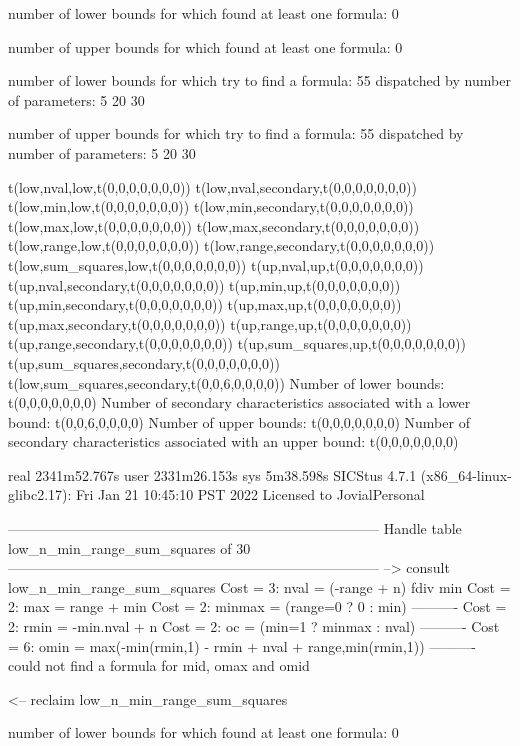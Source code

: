 number of lower bounds for which found at least one formula: 0

number of upper bounds for which found at least one formula: 0

number of lower bounds for which try to find a formula: 55
dispatched by number of parameters: 5  20  30

number of upper bounds for which try to find a formula: 55
dispatched by number of parameters: 5  20  30

t(low,nval,low,t(0,0,0,0,0,0,0))
t(low,nval,secondary,t(0,0,0,0,0,0,0))
t(low,min,low,t(0,0,0,0,0,0,0))
t(low,min,secondary,t(0,0,0,0,0,0,0))
t(low,max,low,t(0,0,0,0,0,0,0))
t(low,max,secondary,t(0,0,0,0,0,0,0))
t(low,range,low,t(0,0,0,0,0,0,0))
t(low,range,secondary,t(0,0,0,0,0,0,0))
t(low,sum_squares,low,t(0,0,0,0,0,0,0))
t(up,nval,up,t(0,0,0,0,0,0,0))
t(up,nval,secondary,t(0,0,0,0,0,0,0))
t(up,min,up,t(0,0,0,0,0,0,0))
t(up,min,secondary,t(0,0,0,0,0,0,0))
t(up,max,up,t(0,0,0,0,0,0,0))
t(up,max,secondary,t(0,0,0,0,0,0,0))
t(up,range,up,t(0,0,0,0,0,0,0))
t(up,range,secondary,t(0,0,0,0,0,0,0))
t(up,sum_squares,up,t(0,0,0,0,0,0,0))
t(up,sum_squares,secondary,t(0,0,0,0,0,0,0))
t(low,sum_squares,secondary,t(0,0,6,0,0,0,0))
Number of lower bounds:                                             t(0,0,0,0,0,0,0)
Number of secondary characteristics associated with a lower bound:  t(0,0,6,0,0,0,0)
Number of upper bounds:                                             t(0,0,0,0,0,0,0)
Number of secondary characteristics associated with an upper bound: t(0,0,0,0,0,0,0)

real	2341m52.767s
user	2331m26.153s
sys	5m38.598s
SICStus 4.7.1 (x86_64-linux-glibc2.17): Fri Jan 21 10:45:10 PST 2022
Licensed to JovialPersonal


--------------------------------------------------------------------------------
Handle table low_n_min_range_sum_squares of 30
--------------------------------------------------------------------------------
--> consult low_n_min_range_sum_squares
Cost =  3:  nval   = (-range + n) fdiv min %
Cost =  2:  max    = range + min
Cost =  2:  minmax = (range=0 ? 0 : min)
----------
Cost =  2:  rmin   = -min.nval + n
Cost =  2:  oc     = (min=1 ? minmax : nval)
----------
Cost =  6:  omin   = max(-min(rmin,1) - rmin + nval + range,min(rmin,1))
----------
could not find a formula for mid, omax and omid

<-- reclaim low_n_min_range_sum_squares

number of lower bounds for which found at least one formula: 0

